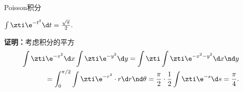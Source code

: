 \begin{example}{Poisson积分}{}
	\begin{center}
		$\int\zti\e^{-t^2}\d t=\frac{\sqrt\pi}2.$
	\end{center}
	\textbf{证明：}考虑积分的平方
	\begin{align*}
		\int\zti\e^{-x^2}\d x\int\zti\e^{-y^2}\d y=\int\zti\int\zti\e^{-x^2-y^2}\d x\nd y \\
		=\int_0^{\pi/2}\int\zti\e^{-r^2}\cdot r\d r\nd\theta=\frac\pi{2}\cdot\frac12\int\zti\e^{-s}\d s=\frac\pi{4}.
	\end{align*}

\end{example}
